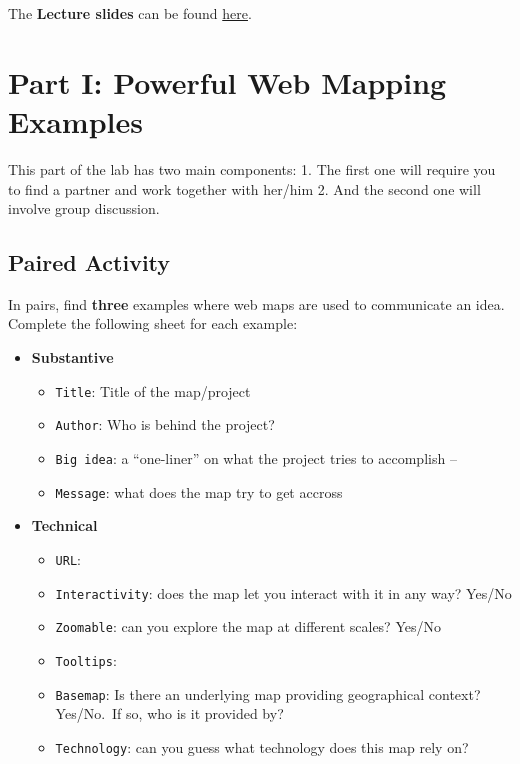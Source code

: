 \documentclass[
  letterpaper,
  DIV=11,
  numbers=noendperiod]{scrreprt}
\providecommand{\tightlist}{%
  \setlength{\itemsep}{0pt}\setlength{\parskip}{0pt}}\usepackage{longtable,booktabs,array}
\begin{document}
The \textbf{Lecture slides} can be found
\href{https://github.com/GDSL-UL/wma/raw/main/lectures/w01.html}{here}.

\section{Part I: Powerful Web Mapping
Examples}\label{part-i-powerful-web-mapping-examples}

This part of the lab has two main components: 1. The first one will
require you to find a partner and work together with her/him 2. And the
second one will involve group discussion.

\subsection{Paired Activity}\label{paired-activity}

In pairs, find \textbf{three} examples where web maps are used to
communicate an idea. Complete the following sheet for each example:

\begin{itemize}
\tightlist
\item
  \textbf{Substantive}

  \begin{itemize}
  \tightlist
  \item
    \texttt{Title}: Title of the map/project
  \item
    \texttt{Author}: Who is behind the project?
  \item
    \texttt{Big\ idea}: a ``one-liner'' on what the project tries to
    accomplish --
  \item
    \texttt{Message}: what does the map try to get accross
  \end{itemize}
\item
  \textbf{Technical}

  \begin{itemize}
  \tightlist
  \item
    \texttt{URL}:
  \item
    \texttt{Interactivity}: does the map let you interact with it in any
    way? Yes/No
  \item
    \texttt{Zoomable}: can you explore the map at different scales?
    Yes/No
  \item
    \texttt{Tooltips}:
  \item
    \texttt{Basemap}: Is there an underlying map providing geographical
    context? Yes/No.~If so, who is it provided by?
  \item
    \texttt{Technology}: can you guess what technology does this map
    rely on?
  \end{itemize}
\end{itemize}
\end{document}

